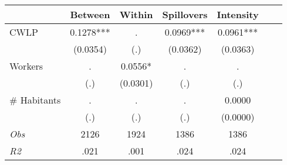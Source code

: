 \begin{tabular}{l*{6}{c}}\hline&\multicolumn{1}{c}{Between}&\multicolumn{1}{c}{Within}&\multicolumn{1}{c}{Spillovers}&\multicolumn{1}{c}{Intensity}\\ \hline 
CWLP & 0.1278*** & . & 0.0969*** & 0.0961*** \\
 & (0.0354) & (.) & (0.0362) & (0.0363) \\
Workers & . & 0.0556* & . & . \\
 & (.) & (0.0301) & (.) & (.) \\
\# Habitants & . & . & . & 0.0000 \\
  & (.) & (.) & (.) & (0.0000) \\
\hline \textit{Obs} & 2126 & 1924 & 1386 & 1386  \\ \textit{R2} & .021 & .001 & .024 & .024 \\ \hline \end{tabular}
